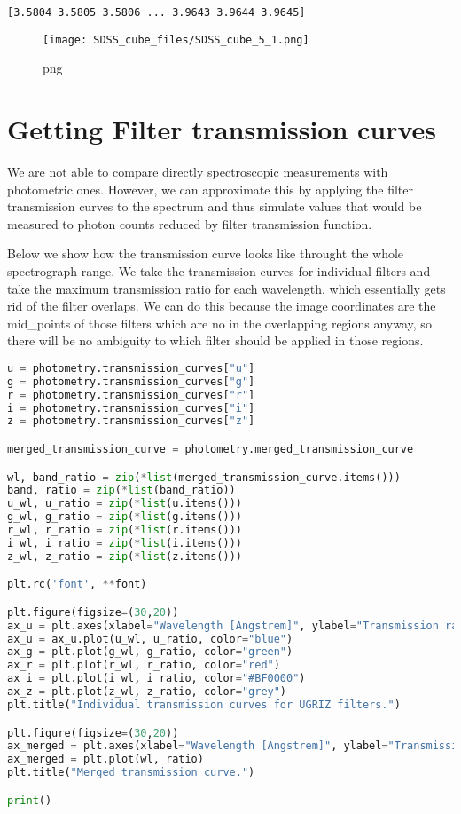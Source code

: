\begin{lstlisting}
[3.5804 3.5805 3.5806 ... 3.9643 3.9644 3.9645]
\end{lstlisting}

\begin{figure}
\centering
\texttt{[image: SDSS\_cube\_files/SDSS\_cube\_5\_1.png]}
\caption{png}
\end{figure}

\section{Getting Filter transmission
curves}\label{getting-filter-transmission-curves}

We are not able to compare directly spectroscopic measurements with
photometric ones. However, we can approximate this by applying the
filter transmission curves to the spectrum and thus simulate values that
would be measured to photon counts reduced by filter transmission
function.

Below we show how the transmission curve looks like throught the whole
spectrograph range. We take the transmission curves for individual
filters and take the maximum transmission ratio for each wavelength,
which essentially gets rid of the filter overlaps. We can do this
because the image coordinates are the mid\_points of those filters which
are no in the overlapping regions anyway, so there will be no ambiguity
to which filter should be applied in those regions.

\begin{lstlisting}[language=Python]
u = photometry.transmission_curves["u"]
g = photometry.transmission_curves["g"]
r = photometry.transmission_curves["r"]
i = photometry.transmission_curves["i"]
z = photometry.transmission_curves["z"]

merged_transmission_curve = photometry.merged_transmission_curve

wl, band_ratio = zip(*list(merged_transmission_curve.items()))
band, ratio = zip(*list(band_ratio))
u_wl, u_ratio = zip(*list(u.items()))
g_wl, g_ratio = zip(*list(g.items()))
r_wl, r_ratio = zip(*list(r.items()))
i_wl, i_ratio = zip(*list(i.items()))
z_wl, z_ratio = zip(*list(z.items()))

plt.rc('font', **font)

plt.figure(figsize=(30,20))
ax_u = plt.axes(xlabel="Wavelength [Angstrem]", ylabel="Transmission ratio")
ax_u = ax_u.plot(u_wl, u_ratio, color="blue")
ax_g = plt.plot(g_wl, g_ratio, color="green")
ax_r = plt.plot(r_wl, r_ratio, color="red")
ax_i = plt.plot(i_wl, i_ratio, color="#BF0000")
ax_z = plt.plot(z_wl, z_ratio, color="grey")
plt.title("Individual transmission curves for UGRIZ filters.")

plt.figure(figsize=(30,20))
ax_merged = plt.axes(xlabel="Wavelength [Angstrem]", ylabel="Transmission ratio")
ax_merged = plt.plot(wl, ratio)
plt.title("Merged transmission curve.")

print()
\end{lstlisting}

